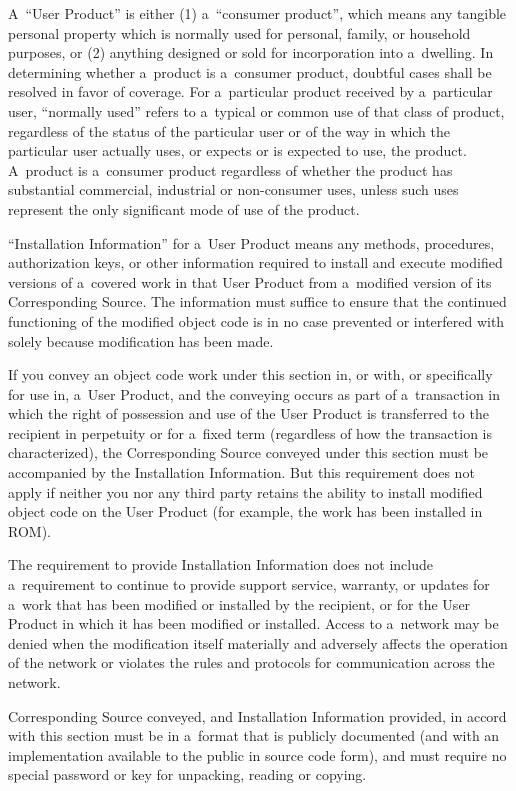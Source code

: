 \documentclass[a4paper, 11pt, twoside]{article}
\begin{document}
A~“User Product” is either (1) a~“consumer product”, which means any tangible personal property which is normally used for personal, family, or household purposes, or (2) anything designed or sold for incorporation into a~dwelling. In determining whether a~product is a~consumer product, doubtful cases shall be resolved in favor of coverage. For a~particular product received by a~particular user, “normally used” refers to a~typical or common use of that class of product, regardless of the status of the particular user or of the way in which the particular user actually uses, or expects or is expected to use, the product. A~product is a~consumer product regardless of whether the product has substantial commercial, industrial or non-consumer uses, unless such uses represent the only significant mode of use of the product.

“Installation Information” for a~User Product means any methods, procedures, authorization keys, or other information required to install and execute modified versions of a~covered work in that User Product from a~modified version of its Corresponding Source. The information must suffice to ensure that the continued functioning of the modified object code is in no case prevented or interfered with solely because modification has been made.

If you convey an object code work under this section in, or with, or specifically for use in, a~User Product, and the conveying occurs as part of a~transaction in which the right of possession and use of the User Product is transferred to the recipient in perpetuity or for a~fixed term (regardless of how the transaction is characterized), the Corresponding Source conveyed under this section must be accompanied by the Installation Information. But this requirement does not apply if neither you nor any third party retains the ability to install modified object code on the User Product (for example, the work has been installed in ROM).

The requirement to provide Installation Information does not include a~requirement to continue to provide support service, warranty, or updates for a~work that has been modified or installed by the recipient, or for the User Product in which it has been modified or installed. Access to a~network may be denied when the modification itself materially and adversely affects the operation of the network or violates the rules and protocols for communication across the network.

Corresponding Source conveyed, and Installation Information provided, in accord with this section must be in a~format that is publicly documented (and with an implementation available to the public in source code form), and must require no special password or key for unpacking, reading or copying.
\end{document}
